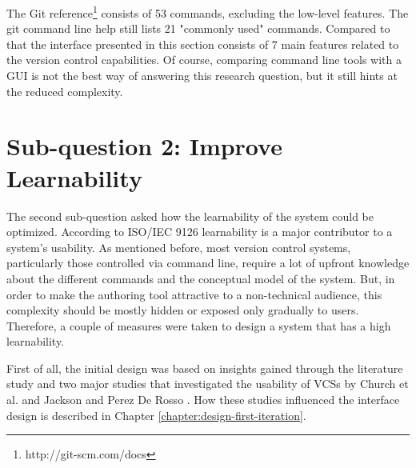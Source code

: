 
The Git reference\footnote{http://git-scm.com/docs} consists of 53 commands, excluding the low-level features. The git command line help still lists 21 "commonly used" commands. Compared to that the interface presented in this section consists of 7 main features related to the version control capabilities. Of course, comparing command line tools with a GUI is not the best way of answering this research question, but it still hints at the reduced complexity.










\section{Sub-question 2: Improve Learnability}
The second sub-question asked how the learnability of the system could be optimized. According to ISO/IEC 9126 \cite{_iso/iec_2001} learnability is a major contributor to a system's usability. As mentioned before, most version control systems, particularly those controlled via command line, require a lot of upfront knowledge about the different commands and  the conceptual model of the system. But, in order to make the authoring tool attractive to a non-technical audience, this complexity should be mostly hidden or exposed only gradually to users. Therefore, a couple of measures were taken to design a system that has a high learnability.

First of all, the initial design was based on insights gained through the literature study and two major studies that investigated the usability of VCSs by Church et al. \cite{church_case_2014} and Jackson and Perez De Rosso \cite{perez_de_rosso_whats_2013}. How these studies influenced the interface design is described in Chapter \ref{chapter:design-first-iteration}.

